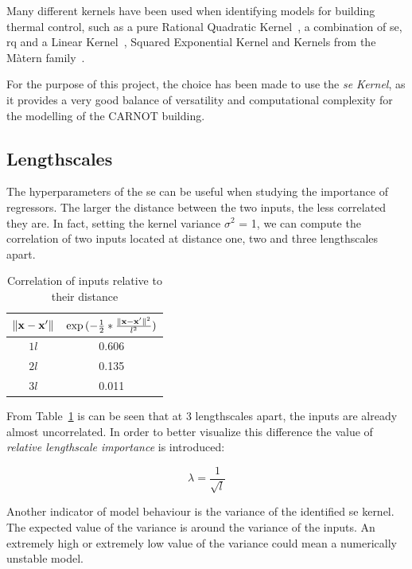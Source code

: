Many different kernels have been used when identifying models for building
thermal control, such as a pure Rational Quadratic
Kernel~\cite{pleweSupervisoryModelPredictive2020}, a combination of
\acrshort{se}, \acrshort{rq} and a Linear
Kernel~\cite{jainLearningControlUsing2018}, Squared Exponential Kernel and
Kernels from the M\`atern family~\cite{massagrayThermalBuildingModelling2016}.

For the purpose of this project, the choice has been made to use the
\textit{\acrlong{se} Kernel}, as it provides a very good balance of versatility
and computational complexity for the modelling of the CARNOT building.

\subsection{Lengthscales}\label{sec:lengthscales}

The hyperparameters of the \acrshort{se} can be useful when studying the
importance of regressors. The larger the distance between the two inputs, the
less correlated they are. In fact, setting the kernel variance $\sigma^2$ = 1,
we can compute the correlation of two inputs located at distance one, two and
three lengthscales apart. 

\begin{table}[ht]
\centering
    \begin{tabular}{||c c ||}
        \hline
        $\lVert\mathbf{x} - \mathbf{x}'\rVert$ &
        $\exp{(-\frac{1}{2}*\frac{\lVert\mathbf{x} - \mathbf{x}'\rVert^2}{l^2})}$ \\
        \hline \hline
        $1l$ & 0.606 \\
        $2l$ & 0.135 \\
        $3l$ & 0.011 \\
        \hline
    \end{tabular}
\caption{Correlation of inputs relative to their distance}
\label{tab:se_correlation}
\end{table}

From Table~\ref{tab:se_correlation} is can be seen that at 3 lengthscales apart,
the inputs are already almost uncorrelated. In order to better visualize this
difference the value of \textit{relative lengthscale importance} is introduced:

\begin{equation}
    \lambda = \frac{1}{\sqrt{l}}
\end{equation}

Another indicator of model behaviour is the variance of the identified
\acrshort{se} kernel. The expected value of the variance is around the variance
of the inputs. An extremely high or extremely low value of the variance could
mean a numerically unstable model.


